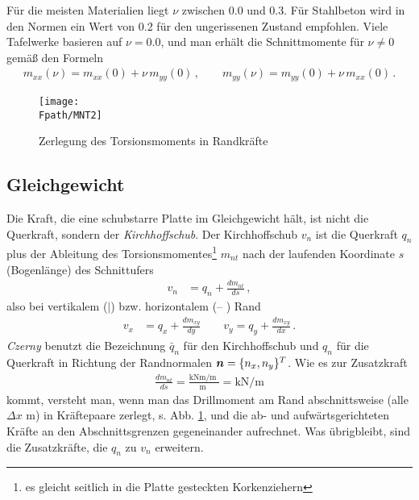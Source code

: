 F\"{u}r die meisten Materialien liegt $\nu$ zwischen $0.0$ und $0.3$. F\"{u}r Stahlbeton wird in den Normen ein Wert von 0.2 f\"{u}r den ungerissenen Zustand empfohlen. Viele Tafelwerke basieren auf $\nu = 0.0$, und man erh\"{a}lt die Schnittmomente f\"{u}r $\nu \neq 0$ gem\"{a}{\ss} den Formeln
\begin{align}
m_{xx}(\nu)  = m_{xx}(0) + \nu \,m_{yy}(0)\,, \qquad m_{yy}(\nu)  = m_{yy}(0)  + \nu
\,m_{xx}(0)\,.
\end{align}

\begin{figure}[tbp]
\centering
\if {} \sidecaption \fi
\texttt{[image: \\Fpath/MNT2]}
\caption{ Zerlegung des Torsionsmoments in Randkr\"{a}fte} \label{Mnt}
\end{figure}%

{\textcolor{sectionTitleBlue}{\subsection{Gleichgewicht}}}

Die Kraft, die eine schubstarre Platte im Gleichgewicht h\"{a}lt, ist nicht die Querkraft, sondern der {\em Kirchhoffschub}. Der Kirchhoffschub $v_n$ ist die Querkraft $q_n$ plus der Ableitung des Torsionsmomentes\footnote{es gleicht seitlich in die Platte gesteckten Korkenziehern} $m_{nt}$ nach der laufenden Koordinate $s$ (Bogenl\"{a}nge) des Schnittufers
\begin{align}
v_n &= q_n + \frac{d m_{nt}}{ds}\,,
\end{align}
also bei vertikalem ($|$) bzw. horizontalem (-- ) Rand
\begin{align}
v_x &= q_x + \frac{d m_{xy}}{dy} \quad \quad v_y = q_y + \frac{d m_{xy}}{dx}\,.
\end{align}
{\em Czerny\/} \cite{Czerny} benutzt die Bezeichnung $\bar q_n$ f\"{u}r den Kirchhoffschub und $q_n$ f\"{u}r die Querkraft in Richtung der Randnormalen $\mbox{\boldmath $n$} = \{n_x, n_y\}^T$. Wie es zur Zusatzkraft
\begin{align}
\frac{d m_{nt} }{ds} = \frac{\mbox{kNm/m }}{\mbox{m }} = \mbox{kN/m}
\end{align}
kommt, versteht man, wenn man das Drillmoment am Rand abschnittsweise (alle $\Delta x$ m) in Kr\"{a}ftepaare zerlegt, s. Abb. \ref{Mnt}, und die ab- und aufw\"{a}rtsgerichteten Kr\"{a}fte an den Abschnittsgrenzen gegeneinander aufrechnet. Was \"{u}brigbleibt, sind die Zusatzkr\"{a}fte, die $q_n$ zu $v_n$ erweitern.

